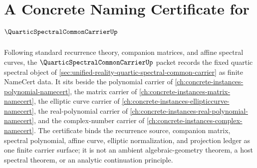 \chapter{A Concrete Naming Certificate for $\QuarticSpectralCommonCarrierUp$}
\label{ch:concrete-instances-quartic-spectral-common-carrier-namecert}

Following standard recurrence theory, companion matrices, and affine spectral curves, the $\QuarticSpectralCommonCarrierUp$ packet records the fixed quartic spectral object of \autoref{sec:unified-reality-quartic-spectral-common-carrier} as finite NameCert data. It sits beside the polynomial carrier of \autoref{ch:concrete-instances-polynomial-namecert}, the matrix carrier of \autoref{ch:concrete-instances-matrix-namecert}, the elliptic curve carrier of \autoref{ch:concrete-instances-ellipticcurve-namecert}, the real-polynomial carrier of \autoref{ch:concrete-instances-real-polynomial-namecert}, and the complex-number carrier of \autoref{ch:concrete-instances-complex-namecert}. The certificate binds the recurrence source, companion matrix, spectral polynomial, affine curve, elliptic normalization, and projection ledger as one finite carrier surface; it is not an ambient algebraic-geometry theorem, a host spectral theorem, or an analytic continuation principle.

